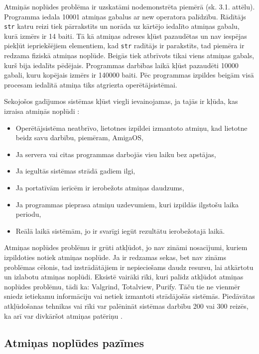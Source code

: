 Atmiņās noplūdes problēma ir uzskatāmi nodemonstrēta piemērā (sk. 3.1. attēlu).
Programma  iedala 10001 atmiņas gabalus ar new operatora palīdzību. 
Rādītājs \texttt{str} katru reizi tiek pārrakstīts un norāda uz kārtējo iedalīto atmiņas gabalu, kurā izmērs ir 14 baiti.
Tā kā atmiņas adreses kļūst pazaudētas un nav iespējas piekļūt iepriekšējiem elementiem, kad  \texttt{str} radītājs ir parakstīts, tad piemēra ir redzama fiziskā atmiņas noplūde.
Beigās tiek atbrīvots tikai viens atmiņas gabals, kurš bija iedalīts pēdējais. 
Programmas darbības laikā kļūst pazaudēti 10000 gabali, kuru kopējais izmērs ir 140000 baiti.
 Pēc programmas izpildes beigām visā procesam iedalītā atmiņa tiks atgriezta operētājsistēmai.


Sekojošos gadījumos sistēmas kļūst viegli ievainojamas, ja tajās ir kļūda, kas izraisa atmiņās noplūdi \cite{RTTV}: 
\begin{itemize}
\item { Operētājsistēma neatbrīvo, lietotnes izpildei izmantoto atmiņu, kad lietotne beidz savu darbību, piemēram, AmigaOS,}
\item { Ja servera vai citas programmas darbojās visu laiku bez apstājas, }
\item { Ja iegultās sistēmas strādā gadiem ilgi, }
\item { Ja portatīvām ierīcēm ir ierobežots atmiņas daudzums, }
\item { Ja programmas pieprasa atmiņu uzdevumiem, kuri izpildās ilgstošu laika periodu, }
\item { Reālā laikā sistēmām, jo ir svarīgi iegūt rezultātu ierobežotajā laikā. }
\end{itemize}

Atmiņas noplūdes problēmu ir grūti atkļūdot,  jo nav zināmi nosacījumi, kuriem izpildoties notiek atmiņas noplūde. 
Ja ir redzamas sekas, bet nav zināms problēmas cēlonis, tad izstrādātājiem ir nepieciešams daudz resursu, lai atkārtotu un izlabotu atmiņas noplūdi. 
Eksistē vairāki rīki, kuri palīdz atkļūdot atmiņas noplūdes problēmu, tādi ka: Valgrind, Totalview, Purify. 
Tāču tie ne vienmēr sniedz ietiekamu informāciju vai netiek izmantoti strādājošās sistēmās.
Piedāvātas atkļūdošanas tehnikas vai rīki var palēnināt sistēmas darbību 200 vai 300 reizēs, ka arī var divkāršot atmiņas patēriņu \cite{atparv}. 



\subsection{Atmiņas noplūdes pazīmes}


